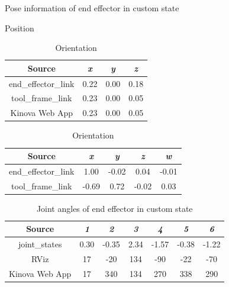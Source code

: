 \documentclass[12pt]{article}
\begin{document}
\begin{enumerate}
\begin{enumerate}
        \begin{table}[H]
            \caption{Pose information of end effector in custom state}
            \begin{subtable}{.4\linewidth}
                \centering
                \caption{Position}
                \begin{tabular}{cccc}
                    \toprule
                    Source & \textit{x} & \textit{y} & \textit{z} \\\midrule
                    end\_effector\_link & 0.22 & 0.00 & 0.18 \\
                    tool\_frame\_link & 0.23 & 0.00 & 0.05 \\
                    Kinova Web App & 0.23 & 0.00 & 0.05 \\\bottomrule
                \end{tabular}
            \end{subtable}
            \hfill
            \begin{subtable}{.52\linewidth}
                \centering
                \caption{Orientation}
                \begin{tabular}{ccccc}
                    \toprule
                    Source & \textit{x} & \textit{y} & \textit{z} & \textit{w} \\\midrule
                    end\_effector\_link & 1.00 & -0.02 & 0.04 & -0.01 \\
                    tool\_frame\_link & -0.69 & 0.72 & -0.02 & 0.03 \\\bottomrule
                \end{tabular}
            \end{subtable}
        \end{table}
        \vspace{-10pt}
        \begin{table}[H]
            \centering
            \caption{Joint angles of end effector in custom state}
            \begin{tabular}{ccccccc}
            \toprule
            Source & \textit{1} & \textit{2} & \textit{3} & \textit{4} & \textit{5} & \textit{6} \\\midrule
            joint\_states & 0.30 & -0.35 & 2.34 & -1.57 & -0.38 & -1.22 \\
            RViz & 17 & -20 & 134 & -90 & -22 & -70 \\
            Kinova Web App & 17 & 340 & 134 & 270 & 338 & 290 \\\bottomrule
            \end{tabular}
        \end{table}


\end{enumerate}
\end{enumerate}
\end{document}
